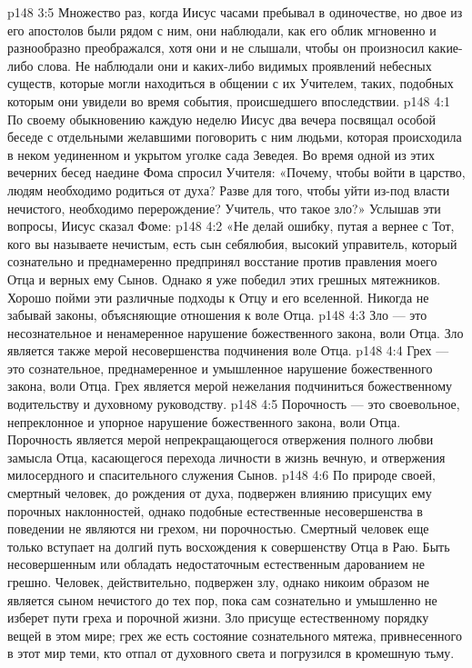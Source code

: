 \vs p148 3:5 Множество раз, когда Иисус часами пребывал в одиночестве, но двое из его апостолов были рядом с ним, они наблюдали, как его облик мгновенно и разнообразно преображался, хотя они и не слышали, чтобы он произносил какие\hyp{}либо слова. Не наблюдали они и каких\hyp{}либо видимых проявлений небесных существ, которые могли находиться в общении с их Учителем, таких, подобных которым они увидели во время события, происшедшего впоследствии.
\vs p148 4:1 По своему обыкновению каждую неделю Иисус два вечера посвящал особой беседе с отдельными желавшими поговорить с ним людьми, которая происходила в неком уединенном и укрытом уголке сада Зеведея. Во время одной из этих вечерних бесед наедине Фома спросил Учителя: «Почему, чтобы войти в царство, людям необходимо родиться от духа? Разве для того, чтобы уйти из\hyp{}под власти нечистого, необходимо перерождение? Учитель, что такое зло?» Услышав эти вопросы, Иисус сказал Фоме:
\vs p148 4:2 \pc «Не делай ошибку, путая  а вернее с  Тот, кого вы называете нечистым, есть сын себялюбия, высокий управитель, который сознательно и преднамеренно предпринял восстание против правления моего Отца и верных ему Сынов. Однако я уже победил этих грешных мятежников. Хорошо пойми эти различные подходы к Отцу и его вселенной. Никогда не забывай законы, объясняющие отношения к воле Отца.
\vs p148 4:3 Зло --- это несознательное и ненамеренное нарушение божественного закона, воли Отца. Зло является также мерой несовершенства подчинения воле Отца.
\vs p148 4:4 Грех --- это сознательное, преднамеренное и умышленное нарушение божественного закона, воли Отца. Грех является мерой нежелания подчиниться божественному водительству и духовному руководству.
\vs p148 4:5 Порочность --- это своевольное, непреклонное и упорное нарушение божественного закона, воли Отца. Порочность является мерой непрекращающегося отвержения полного любви замысла Отца, касающегося перехода личности в жизнь вечную, и отвержения милосердного и спасительного служения Сынов.
\vs p148 4:6 По природе своей, смертный человек, до рождения от духа, подвержен влиянию присущих ему порочных наклонностей, однако подобные естественные несовершенства в поведении не являются ни грехом, ни порочностью. Смертный человек еще только вступает на долгий путь восхождения к совершенству Отца в Раю. Быть несовершенным или обладать недостаточным естественным дарованием не грешно. Человек, действительно, подвержен злу, однако никоим образом не является сыном нечистого до тех пор, пока сам сознательно и умышленно не изберет пути греха и порочной жизни. Зло присуще естественному порядку вещей в этом мире; грех же есть состояние сознательного мятежа, привнесенного в этот мир теми, кто отпал от духовного света и погрузился в кромешную тьму.
